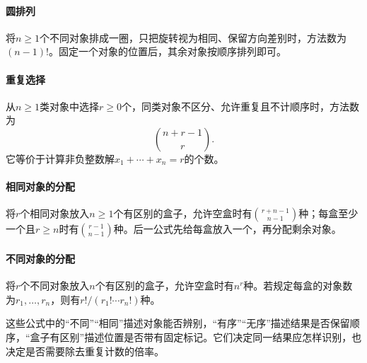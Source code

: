 \paragraph{圆排列} 将\(n\ge1\)个不同对象排成一圈，只把旋转视为相同、保留方向差别时，方法数为\((n-1)!\)。固定一个对象的位置后，其余对象按顺序排列即可。

\paragraph{重复选择} 从\(n\ge1\)类对象中选择\(r\ge0\)个，同类对象不区分、允许重复且不计顺序时，方法数为
\begin{equation*}
 \binom{n+r-1}r.
\end{equation*}
它等价于计算非负整数解\(x_1+\cdots+x_n=r\)的个数。

\paragraph{相同对象的分配} 将\(r\)个相同对象放入\(n\ge1\)个有区别的盒子，允许空盒时有\(\binom{r+n-1}{n-1}\)种；每盒至少一个且\(r\ge n\)时有\(\binom{r-1}{n-1}\)种。后一公式先给每盒放入一个，再分配剩余对象。

\paragraph{不同对象的分配} 将\(r\)个不同对象放入\(n\)个有区别的盒子，允许空盒时有\(n^r\)种。若规定每盒的对象数为\(r_1,\ldots,r_n\)，则有\(r!/(r_1!\cdots r_n!)\)种。

这些公式中的“不同”“相同”描述对象能否辨别，“有序”“无序”描述结果是否保留顺序，“盒子有区别”描述位置是否带有固定标记。它们决定同一结果应怎样识别，也决定是否需要除去重复计数的倍率。
